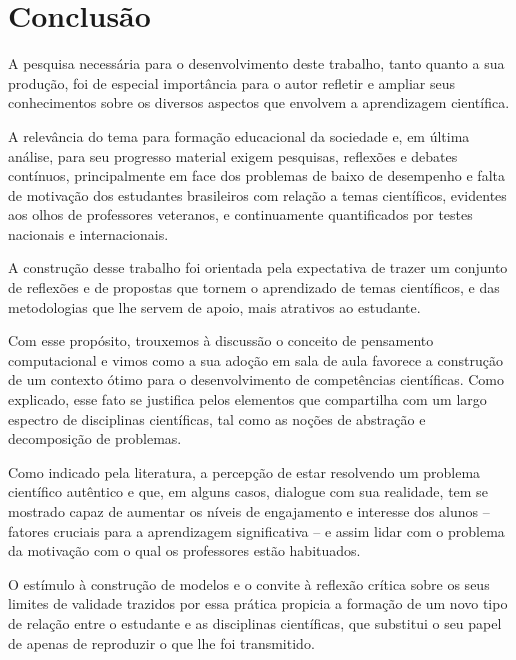\chapter*[Conclusão]{Conclusão}

A pesquisa necessária para o desenvolvimento deste trabalho, tanto quanto a sua produção, foi de especial importância para o autor refletir e ampliar seus conhecimentos sobre os diversos aspectos que envolvem a aprendizagem científica. 

A relevância do tema para formação educacional da sociedade e, em última análise, para seu progresso material exigem pesquisas, reflexões e debates contínuos, principalmente em face dos problemas de baixo de desempenho e falta de motivação dos estudantes brasileiros com relação a temas científicos, evidentes aos olhos de professores veteranos, e continuamente quantificados por testes nacionais e internacionais. 

A construção desse trabalho foi orientada pela expectativa de trazer um conjunto de reflexões e de propostas que tornem o aprendizado de temas científicos, e das metodologias que lhe servem de apoio, mais atrativos ao estudante. 

Com esse propósito, trouxemos à discussão o conceito de pensamento computacional e vimos como a sua adoção em sala de aula favorece a construção de um contexto ótimo para o desenvolvimento de competências científicas. Como explicado, esse fato se justifica pelos elementos que compartilha com um largo espectro de disciplinas científicas, tal como as noções de abstração e decomposição de problemas.

Como indicado pela literatura, a percepção de estar resolvendo um problema científico autêntico e que, em alguns casos, dialogue com sua realidade, tem se mostrado capaz de aumentar os níveis de engajamento e interesse dos alunos -- fatores cruciais para a aprendizagem significativa -- e assim lidar com o problema da motivação com o qual os professores estão habituados.

O estímulo à construção de modelos e o convite à reflexão crítica sobre os seus limites de validade trazidos por essa prática propicia a formação de um novo tipo de relação entre o estudante e as disciplinas científicas, que substitui o seu papel de apenas de reproduzir o que lhe foi transmitido.




